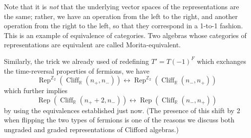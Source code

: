 \documentclass[12pt]{article}
\numberwithin{equation}{section}
\numberwithin{figure}{section}
\theoremstyle{remark}
\def\bR{\mathbb{R}}
\def\bZ{\mathbb{Z}}
\def\Cliff{\mathop{\mathrm{Cliff}}\nolimits}
\def\Rep{\mathop{\mathrm{Rep}}\nolimits}
\begin{document}
Note that it is \emph{not} that the underlying vector spaces of the representations are the same;
rather, we have an operation from the left to the right, and  another operation from the right to the left,
so that they correspond in a 1-to-1 fashion.
This is an example of equivalence of categories.
Two algebras whose categories of representations are equivalent are called Morita-equivalent.

Similarly, the trick we already used of redefining $T'=T(-1)^F$ which exchanges 
the time-reversal properties of fermions, we have \begin{equation}
\Rep^{\bZ_2}(\Cliff_\bR(n_+,n_-)) \leftrightarrow \Rep^{\bZ_2}(\Cliff_\bR(n_-,n_+)) 
\end{equation} which further implies \begin{equation}
\Rep(\Cliff_\bR(n_++2,n_-)) \leftrightarrow \Rep(\Cliff_\bR(n_-,n_+))
\label{funny-cliff-equiv}
\end{equation} by using the equivalences established just now.
(The presence of this shift by 2 when flipping the two types of fermions is one of the reasons
we discuss both ungraded and graded representations of Clifford algebras.)
\end{document}
